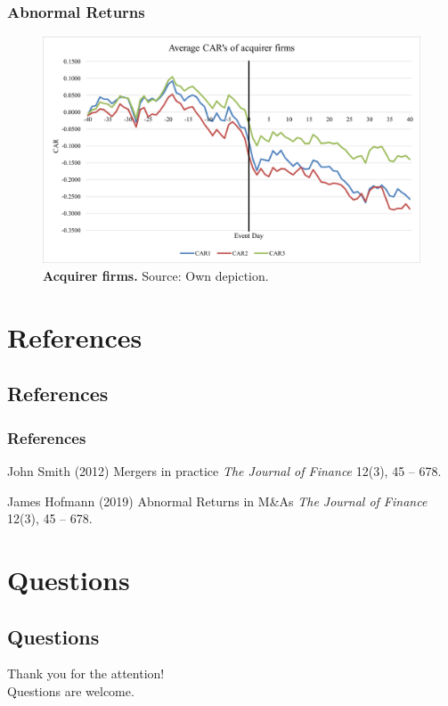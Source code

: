 \documentclass{beamer}
\begin{document}

\begin{frame}
\frametitle{Abnormal Returns }
\begin{figure}[H]
	\centering
	\includegraphics[scale=0.4]{images/Bild2.png}
	\caption{\footnotesize \textbf{Acquirer firms.} Source: Own depiction.}
	\label{bildlyacqui}
\end{figure}
\end{frame}

\section{References}
\subsection{References}
\begin{frame}
\frametitle{References}
\footnotesize{
\begin{thebibliography}{99} %
 John Smith (2012)
\newblock Mergers in practice
\newblock \emph{The Journal of Finance} 12(3), 45 -- 678.

 James Hofmann (2019)
\newblock Abnormal Returns in M\&As
\newblock \emph{The Journal of Finance} 12(3), 45 -- 678.
\end{thebibliography}
}
\end{frame}

\section{Questions}
\subsection{Questions}
\begin{frame}
	\begin{center}
		\Large{
			Thank you for the attention! \\
			Questions are welcome.}
	\end{center}

\end{frame}

\end{document}
